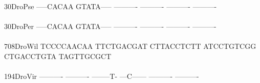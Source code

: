 \documentclass[11pt,twoside,reqno,a4paper]{article}
\begin{document}
{30\hspace*{3\charwidth}DroPse	-----CACAA	GTATA-----	----------	----------	----------	----------	\\
\hspace*{5\charwidth}\hspace*{7\charwidth}\hspace*{1\charwidth}\hspace*{1\charwidth}\hspace*{1\charwidth}\hspace*{1\charwidth}\hspace*{1\charwidth}\hspace*{1\charwidth}\\
30\hspace*{3\charwidth}DroPer	-----CACAA	GTATA-----	----------	----------	----------	----------	\\
\hspace*{5\charwidth}\hspace*{7\charwidth}\hspace*{1\charwidth}\hspace*{1\charwidth}\hspace*{1\charwidth}\hspace*{1\charwidth}\hspace*{1\charwidth}\hspace*{1\charwidth}\\
708\hspace*{2\charwidth}DroWil	TCCCCAACAA	TTCTGACGAT	CTTACCTCTT	ATCCTGTCGG	CTGACCTGTA	TAGTTGCGCT	\\
\hspace*{5\charwidth}\hspace*{7\charwidth}\hspace*{1\charwidth}\hspace*{1\charwidth}\hspace*{1\charwidth}\hspace*{1\charwidth}\hspace*{1\charwidth}\hspace*{1\charwidth}\\
194\hspace*{2\charwidth}DroVir	----------	----------	--------T-	---C------	----------	----------	\\
\hspace*{5\charwidth}\hspace*{7\charwidth}\hspace*{1\charwidth}\hspace*{1\charwidth}\hspace*{1\charwidth}\hspace*{1\charwidth}\hspace*{1\charwidth}\hspace*{1\charwidth}\\
}
\end{document}

